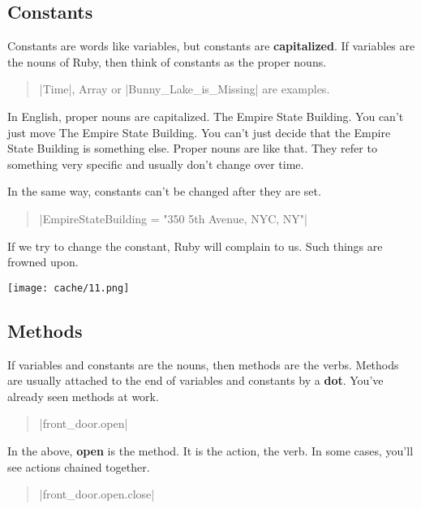 \documentclass[12pt,twoside]{report}
\newcommand*{\plaininline}{\fontfamily{fvm}\small\selectfont}
\begin{document}
\subsection{Constants}



Constants are words like variables, but constants are {\bf
  capitalized}.  If variables are the nouns of Ruby, then think of
constants as the proper nouns.

\begin{quote}
\rubyinline|Time|, {\plaininline Array}
or \rubyinline|Bunny_Lake_is_Missing| are
examples.\end{quote}


In English, proper nouns are capitalized.  The Empire State Building.
You can't just move The Empire State Building.  You can't just decide
that the Empire State Building is something else. Proper nouns are
like that.  They refer to something very specific and usually don't
change over time.

In the same way, constants can't be changed after they are set.

\begin{quote}
\rubyinline|EmpireStateBuilding = "350 5th Avenue, NYC, NY"|\end{quote}


If we try to change the constant, Ruby will complain to us.  Such
things are frowned upon.

	\texttt{[image: cache/11.png]}




\subsection{Methods}



If variables and constants are the nouns, then methods are the
verbs. Methods are usually attached to the end of variables and
constants by a {\bf dot}.  You've already seen methods at work.

\begin{quote}
\rubyinline|front_door.open|\end{quote}


In the above, {\bf open} is the method.  It is the action, the
verb. In some cases, you'll see actions chained together.

\begin{quote}
\rubyinline|front_door.open.close|\end{quote}
\end{document}
